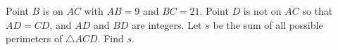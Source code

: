 Point $B$ is on $\overline{AC}$ with $AB = 9$ and $BC = 21$.  Point $D$ is not on $\overline{AC}$ so that $AD = CD$, and $AD$ and $BD$ are integers.  Let $s$ be the sum of all possible perimeters of $\triangle ACD$.  Find $s$.